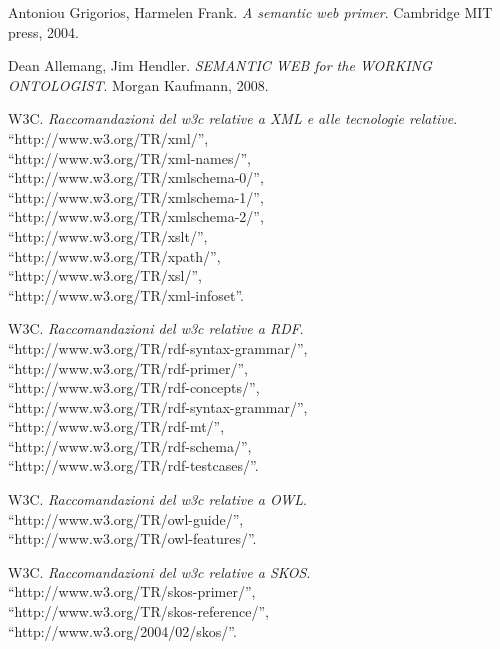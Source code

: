 \clearpage
{}
\begin{thebibliography}{9}

Antoniou Grigorios, Harmelen Frank.
  \emph{A semantic web primer}.
  Cambridge MIT press, 2004.

Dean Allemang, Jim Hendler.
  \emph{SEMANTIC WEB for the WORKING ONTOLOGIST}.
  Morgan Kaufmann, 2008.

W3C.
  \emph{Raccomandazioni del w3c relative a XML e alle tecnologie relative}.\\
  ``http://www.w3.org/TR/xml/'',\\
  ``http://www.w3.org/TR/xml-names/'',\\
  ``http://www.w3.org/TR/xmlschema-0/'',\\
  ``http://www.w3.org/TR/xmlschema-1/'',\\
  ``http://www.w3.org/TR/xmlschema-2/'',\\
  ``http://www.w3.org/TR/xslt/'',\\
  ``http://www.w3.org/TR/xpath/'',\\
  ``http://www.w3.org/TR/xsl/'',\\
  ``http://www.w3.org/TR/xml-infoset''.

W3C.
  \emph{Raccomandazioni del w3c relative a RDF}.\\
  ``http://www.w3.org/TR/rdf-syntax-grammar/'',\\
  ``http://www.w3.org/TR/rdf-primer/'',\\
  ``http://www.w3.org/TR/rdf-concepts/'',\\
  ``http://www.w3.org/TR/rdf-syntax-grammar/'',\\
  ``http://www.w3.org/TR/rdf-mt/'',\\
  ``http://www.w3.org/TR/rdf-schema/'',\\
  ``http://www.w3.org/TR/rdf-testcases/''.

W3C.
  \emph{Raccomandazioni del w3c relative a OWL}.\\
  ``http://www.w3.org/TR/owl-guide/'',\\
  ``http://www.w3.org/TR/owl-features/''.

W3C.
  \emph{Raccomandazioni del w3c relative a SKOS}.\\
  ``http://www.w3.org/TR/skos-primer/'',\\
  ``http://www.w3.org/TR/skos-reference/'',\\
  ``http://www.w3.org/2004/02/skos/''.


\end{thebibliography}

